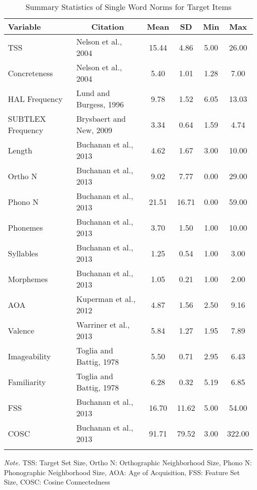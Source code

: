 \documentclass[english,man]{apa6}
\theoremstyle{definition}
\theoremstyle{definition}
\theoremstyle{definition}
\theoremstyle{remark}
\begin{document}
\begin{table}[tbp]
\begin{center}
\begin{threeparttable}
\caption{\label{tab:stim-table-target}Summary Statistics of Single Word Norms for Target Items}
\begin{tabular}{llcccc}
\toprule
Variable & \multicolumn{1}{c}{Citation} & \multicolumn{1}{c}{Mean} & \multicolumn{1}{c}{SD} & \multicolumn{1}{c}{Min} & \multicolumn{1}{c}{Max}\\
\midrule
TSS & Nelson et al., 2004 & 15.44 & 4.86 & 5.00 & 26.00\\
Concreteness & Nelson et al., 2004 & 5.40 & 1.01 & 1.28 & 7.00\\
HAL Frequency & Lund and Burgess, 1996 & 9.78 & 1.52 & 6.05 & 13.03\\
SUBTLEX Frequency & Brysbaert and New, 2009 & 3.34 & 0.64 & 1.59 & 4.74\\
Length & Buchanan et al., 2013 & 4.62 & 1.67 & 3.00 & 10.00\\
Ortho N & Buchanan et al., 2013 & 9.02 & 7.77 & 0.00 & 29.00\\
Phono N & Buchanan et al., 2013 & 21.51 & 16.71 & 0.00 & 59.00\\
Phonemes & Buchanan et al., 2013 & 3.70 & 1.50 & 1.00 & 10.00\\
Syllables & Buchanan et al., 2013 & 1.25 & 0.54 & 1.00 & 3.00\\
Morphemes & Buchanan et al., 2013 & 1.05 & 0.21 & 1.00 & 2.00\\
AOA & Kuperman et al., 2012 & 4.87 & 1.56 & 2.50 & 9.16\\
Valence & Warriner et al., 2013 & 5.84 & 1.27 & 1.95 & 7.89\\
Imageability & Toglia and Battig, 1978 & 5.50 & 0.71 & 2.95 & 6.43\\
Familiarity & Toglia and Battig, 1978 & 6.28 & 0.32 & 5.19 & 6.85\\
FSS & Buchanan et al., 2013 & 16.70 & 11.62 & 5.00 & 54.00\\
COSC & Buchanan et al., 2013 & 91.71 & 79.52 & 3.00 & 322.00\\
\bottomrule
\addlinespace
\end{tabular}
\begin{tablenotes}[para]
\textit{Note.} TSS: Target Set Size, Ortho N: Orthographic Neighborhood Size, Phono N: Phonographic Neighborhood Size, AOA: Age of Acquisition, FSS: Feature Set Size, COSC: Cosine Connectedness
\end{tablenotes}
\end{threeparttable}
\end{center}
\end{table}
\end{document}
